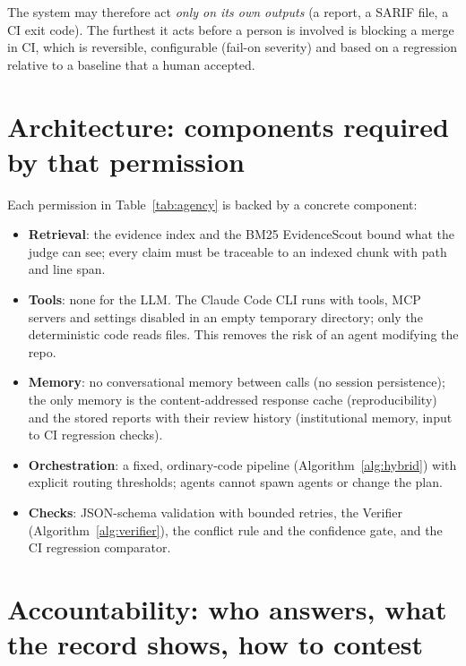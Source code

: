 The system may therefore act \emph{only on its own outputs} (a report, a SARIF file, a CI exit code). The furthest it acts
before a person is involved is blocking a merge in CI, which is reversible, configurable (fail-on severity) and based on a
regression relative to a baseline that a human accepted.

\section{Architecture: components required by that permission}
\label{section:architecture-gov}

Each permission in Table~\ref{tab:agency} is backed by a concrete component:
\begin{itemize}[leftmargin=*]
  \item \textbf{Retrieval}: the evidence index and the BM25 EvidenceScout bound what the judge can see; every claim must be
        traceable to an indexed chunk with path and line span.
  \item \textbf{Tools}: none for the LLM. The Claude Code CLI runs with tools, MCP servers and settings disabled in an empty
        temporary directory; only the deterministic code reads files. This removes the risk of an agent modifying the repo.
  \item \textbf{Memory}: no conversational memory between calls (no session persistence); the only memory is the
        content-addressed response cache (reproducibility) and the stored reports with their review history
        (institutional memory, input to CI regression checks).
  \item \textbf{Orchestration}: a fixed, ordinary-code pipeline (Algorithm~\ref{alg:hybrid}) with explicit routing
        thresholds; agents cannot spawn agents or change the plan.
  \item \textbf{Checks}: JSON-schema validation with bounded retries, the Verifier (Algorithm~\ref{alg:verifier}), the
        conflict rule and the confidence gate, and the CI regression comparator.
\end{itemize}

\section{Accountability: who answers, what the record shows, how to contest}
\label{section:accountability}


